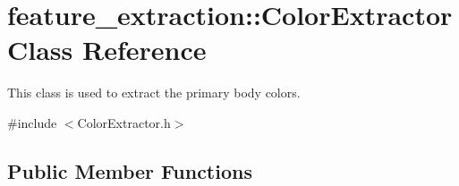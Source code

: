 \hypertarget{classfeature__extraction_1_1_color_extractor}{}\section{feature\+\_\+extraction\+:\+:Color\+Extractor Class Reference}
\label{classfeature__extraction_1_1_color_extractor}


This class is used to extract the primary body colors.  




{\ttfamily \#include $<$Color\+Extractor.\+h$>$}

\subsection*{Public Member Functions}
